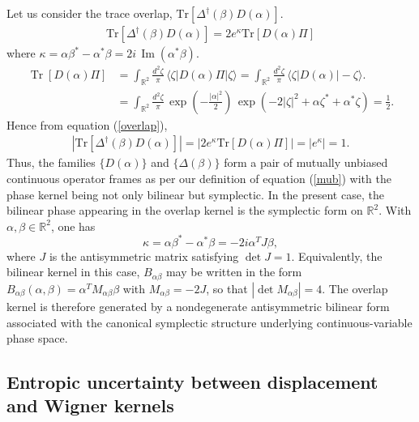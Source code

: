 \documentclass[aps,pra,onecolumn,nofootinbib,superscriptaddress,showpacs]{revtex4}
\begin{document}
Let us consider the trace overlap, $\mathrm{Tr}\!\left[\Delta^\dagger(\beta) D(\alpha)\right]$.
%
\begin{eqnarray}\label{overlap}
\mathrm{Tr}\!\left[\Delta^\dagger(\beta)D(\alpha)\right]=2e^\kappa\mathrm{Tr}\!\left[D(\alpha)\Pi\right]
\end{eqnarray} 
where $\kappa=\alpha\beta^*-\alpha^*\beta=2i\,\operatorname{Im}(\alpha^*\beta)$.
\begin{align}
\operatorname{Tr}[D(\alpha)\Pi]
&=\int_{\mathbb R^2}\frac{d^2\zeta}{\pi}\,
\langle \zeta|D(\alpha)\Pi|\zeta\rangle
=\int_{\mathbb R^2}\frac{d^2\zeta}{\pi}\,
\langle \zeta|D(\alpha)|-\zeta\rangle. \\
&=\int_{\mathbb R^2}\frac{d^2\zeta}{\pi}\,\exp\!\left(-\frac{|\alpha|^2}{2}\right)\,
\exp\!\left(-2|\zeta|^2+\alpha\zeta^*+\alpha^*\zeta\right)=\frac{1}{2}.
\end{align}
Hence from equation (\ref{overlap}),
\begin{eqnarray}
|\mathrm{Tr}\!\left[\Delta^\dagger(\beta)D(\alpha)\right]|=|2e^\kappa\mathrm{Tr}\!\left[D(\alpha)\Pi\right]|=|e^\kappa|=1.
\end{eqnarray} 
Thus, the families $\{D(\alpha)\}$ and $\{\Delta(\beta)\}$ form a pair of
mutually unbiased continuous operator frames as per our definition of equation (\ref{mub}) with the phase kernel being not only bilinear but symplectic.
In the present case, the bilinear phase appearing in the overlap kernel is
the symplectic form on $\mathbb R^2$. With
$\alpha,\beta\in\mathbb{R}^2$, one has
\begin{equation}
\kappa
=
\alpha\beta^*-\alpha^*\beta
=-2i\alpha^{T}
J
\beta,
\end{equation}
where $J$ is the antisymmetric matrix satisfying $\det J = 1$. Equivalently, the bilinear kernel in this case, $B_{\alpha\beta}$ may be written in the form
$B_{\alpha\beta}(\alpha,\beta)=\alpha^T M_{\alpha\beta}\beta$ with $M_{\alpha\beta}=-2J$, so that
$|\det M_{\alpha\beta}|=4$. The overlap kernel is therefore generated by a
nondegenerate antisymmetric bilinear form associated with the canonical
symplectic structure underlying continuous-variable phase space.


\subsection{Entropic uncertainty between displacement and Wigner kernels}
\end{document}
